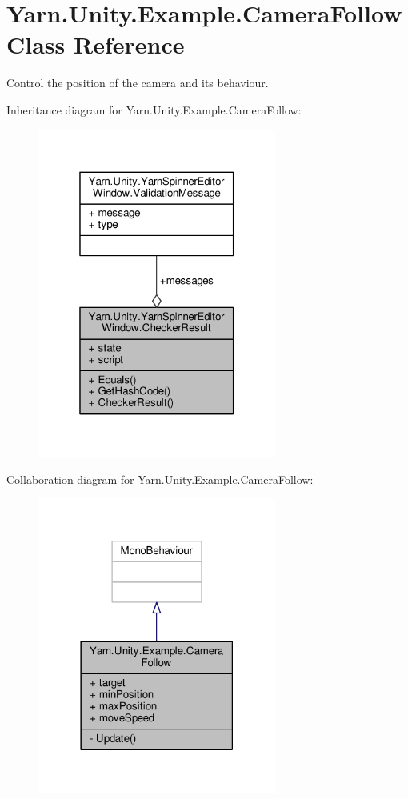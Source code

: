 \hypertarget{a00037}{\section{Yarn.\-Unity.\-Example.\-Camera\-Follow Class Reference}
\label{a00037}
}


Control the position of the camera and its behaviour.  




Inheritance diagram for Yarn.\-Unity.\-Example.\-Camera\-Follow\-:
\nopagebreak
\begin{figure}[H]
\begin{center}
\leavevmode
\includegraphics[width=222pt]{a00783}
\end{center}
\end{figure}


Collaboration diagram for Yarn.\-Unity.\-Example.\-Camera\-Follow\-:
\nopagebreak
\begin{figure}[H]
\begin{center}
\leavevmode
\includegraphics[width=222pt]{a00784}
\end{center}
\end{figure}
